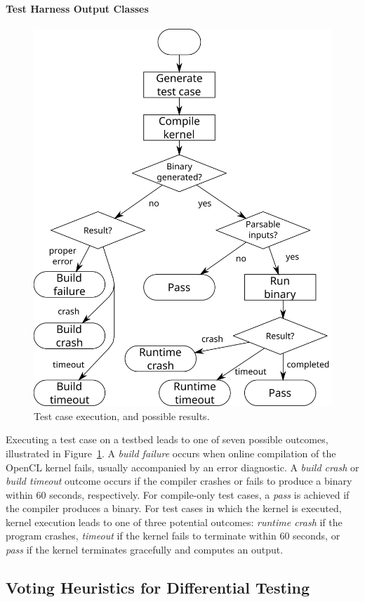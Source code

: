 \paragraph*{Test Harness Output Classes}
\begin{figure}
  \centering %
  \includegraphics[width=.7\columnwidth]{img/testprocess-long}
  \vspace{-.5em}
  \caption{%
  Test case execution, and possible results.%
  \vspace{-1.5em}
  }%
  \label{fig:test-process}
\end{figure}
Executing a test case on a testbed leads to one of seven possible outcomes,
illustrated in Figure~\ref{fig:test-process}. A \emph{build failure} occurs when
online compilation of the OpenCL kernel fails, usually accompanied by an error
diagnostic. A \emph{build crash} or \emph{build timeout} outcome occurs if the
compiler crashes or fails to produce a binary within 60 seconds, respectively.
For compile-only test cases, a \emph{pass} is achieved if the compiler produces
a binary. For test cases in which the kernel is executed, kernel execution leads
to one of three potential outcomes: \emph{runtime crash} if the program crashes,
\emph{timeout} if the kernel fails to terminate within 60 seconds, or
\emph{pass} if the kernel terminates gracefully and computes an output.

\subsection{Voting Heuristics for Differential Testing}

